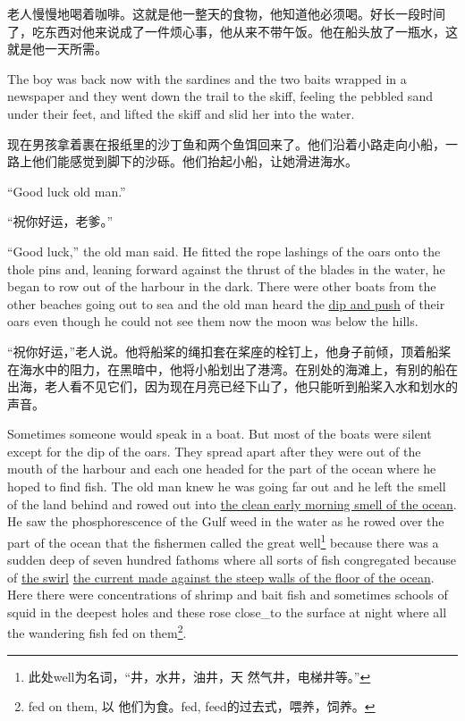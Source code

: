 \begin{paracol}{2}
\switchcolumn

老人慢慢地喝着咖啡。这就是他一整天的食物，他知道他必须喝。好长一段时间了，吃东西对他来说成了一件烦心事，他从来不带午饭。他在船头放了一瓶水，这就是他一天所需。

\switchcolumn*

The boy was back now with the sardines and the two baits wrapped in a
newspaper and they went down the \gls{trail} to the skiff, feeling the
\gls{pebbled} sand under their feet, and \gls{lifted} the skiff and
\gls{slid} her into the water.

\switchcolumn

现在男孩拿着裹在报纸里的沙丁鱼和两个鱼饵回来了。他们沿着小路走向小船，一路上他们能感觉到脚下的沙砾。他们抬起小船，让她滑进海水。

\switchcolumn*

``Good luck old man.''

\switchcolumn

“祝你好运，老爹。”

\switchcolumn*

``Good luck,'' the old man said. He fitted the rope \glspl{lashing} of the
\glspl{oar} onto the \gls{thole}
\glspl{pin} and, \gls{leaning} forward against the \gls{thrust} of the
\glspl{blade} in the water, he began to row out of the harbour in the dark.
There were other boats from the other beaches going out to sea and the old
man heard the \uline{\gls{dip} and push} of their oars even though he could
not see them now the moon was below the hills.

\switchcolumn

“祝你好运，”老人说。他将船桨的绳扣套在桨座的栓钉上，他身子前倾，顶着船桨在海水中的阻力，在黑暗中，他将小船划出了港湾。在别处的海滩上，有别的船在出海，老人看不见它们，因为现在月亮已经下山了，他只能听到船桨入水和划水的声音。

\switchcolumn*

Sometimes someone would speak in a boat. But most of the boats were silent
except for the \gls{dip} of the oars. They spread \gls{apart} after they
were out of the mouth of the harbour and each one headed for the part of the
ocean where he hoped to find fish. The old man knew he was going far out and
he left the smell of the land behind and rowed out into \uline{the clean
  early morning smell of the ocean}. He saw the \gls{phosphorescence} of the
Gulf weed in the water as he rowed over the part of the ocean that the
fishermen called the great well\footnote{此处well为名词，“井，水井，油井，天
  然气井，电梯井等。”} because there was a \gls{sudden} deep of seven
hundred \glspl{fathom} where all sorts of fish \gls{congregated} because of
\uline{the \gls{swirl}} \uline{the current made against the \gls{steep}
  walls of the floor of the ocean}. Here there were \glspl{concentration} of
\gls{shrimp} and bait fish and sometimes \glspl{school} of \gls{squid} in
the deepest holes and these \gls{rose} \gls{close_to} the \gls{surface} at
night where all the \gls{wandering} fish fed on them\footnote{fed on them, 以
  他们为食。fed, feed的过去式，喂养，饲养。}.


\end{paracol}
